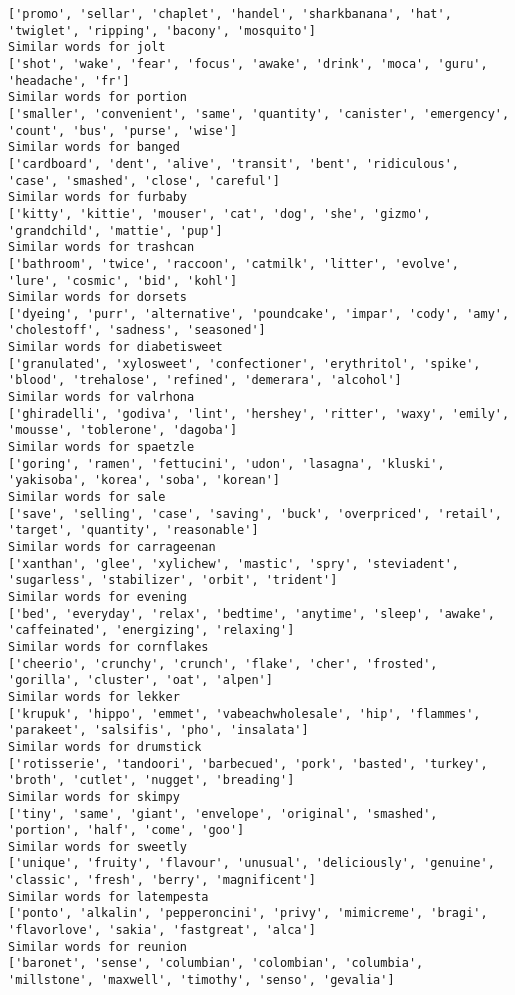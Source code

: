 \documentclass[11pt]{article}
\begin{document}
\begin{Verbatim}[commandchars=\\\{\}]
['promo', 'sellar', 'chaplet', 'handel', 'sharkbanana', 'hat', 'twiglet', 'ripping', 'bacony', 'mosquito']
Similar words for jolt
['shot', 'wake', 'fear', 'focus', 'awake', 'drink', 'moca', 'guru', 'headache', 'fr']
Similar words for portion
['smaller', 'convenient', 'same', 'quantity', 'canister', 'emergency', 'count', 'bus', 'purse', 'wise']
Similar words for banged
['cardboard', 'dent', 'alive', 'transit', 'bent', 'ridiculous', 'case', 'smashed', 'close', 'careful']
Similar words for furbaby
['kitty', 'kittie', 'mouser', 'cat', 'dog', 'she', 'gizmo', 'grandchild', 'mattie', 'pup']
Similar words for trashcan
['bathroom', 'twice', 'raccoon', 'catmilk', 'litter', 'evolve', 'lure', 'cosmic', 'bid', 'kohl']
Similar words for dorsets
['dyeing', 'purr', 'alternative', 'poundcake', 'impar', 'cody', 'amy', 'cholestoff', 'sadness', 'seasoned']
Similar words for diabetisweet
['granulated', 'xylosweet', 'confectioner', 'erythritol', 'spike', 'blood', 'trehalose', 'refined', 'demerara', 'alcohol']
Similar words for valrhona
['ghiradelli', 'godiva', 'lint', 'hershey', 'ritter', 'waxy', 'emily', 'mousse', 'toblerone', 'dagoba']
Similar words for spaetzle
['goring', 'ramen', 'fettucini', 'udon', 'lasagna', 'kluski', 'yakisoba', 'korea', 'soba', 'korean']
Similar words for sale
['save', 'selling', 'case', 'saving', 'buck', 'overpriced', 'retail', 'target', 'quantity', 'reasonable']
Similar words for carrageenan
['xanthan', 'glee', 'xylichew', 'mastic', 'spry', 'steviadent', 'sugarless', 'stabilizer', 'orbit', 'trident']
Similar words for evening
['bed', 'everyday', 'relax', 'bedtime', 'anytime', 'sleep', 'awake', 'caffeinated', 'energizing', 'relaxing']
Similar words for cornflakes
['cheerio', 'crunchy', 'crunch', 'flake', 'cher', 'frosted', 'gorilla', 'cluster', 'oat', 'alpen']
Similar words for lekker
['krupuk', 'hippo', 'emmet', 'vabeachwholesale', 'hip', 'flammes', 'parakeet', 'salsifis', 'pho', 'insalata']
Similar words for drumstick
['rotisserie', 'tandoori', 'barbecued', 'pork', 'basted', 'turkey', 'broth', 'cutlet', 'nugget', 'breading']
Similar words for skimpy
['tiny', 'same', 'giant', 'envelope', 'original', 'smashed', 'portion', 'half', 'come', 'goo']
Similar words for sweetly
['unique', 'fruity', 'flavour', 'unusual', 'deliciously', 'genuine', 'classic', 'fresh', 'berry', 'magnificent']
Similar words for latempesta
['ponto', 'alkalin', 'pepperoncini', 'privy', 'mimicreme', 'bragi', 'flavorlove', 'sakia', 'fastgreat', 'alca']
Similar words for reunion
['baronet', 'sense', 'columbian', 'colombian', 'columbia', 'millstone', 'maxwell', 'timothy', 'senso', 'gevalia']

\end{Verbatim}
\end{document}
